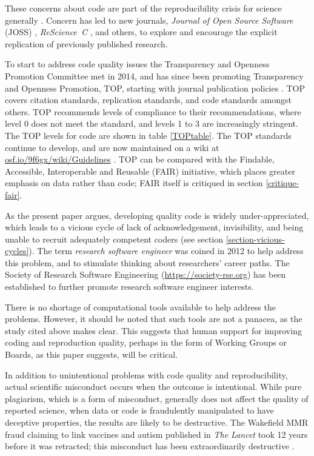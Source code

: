 \documentclass{comjnl}
\begin{document}
These concerns about code are part of the reproducibility crisis for science generally \cite{machine-learning-reproducibility,no-raw-data,data-access,reproducible-manifesto,reproducibility-crisis}. Concern has led to new journals, \emph{Journal of Open Source Software\/} (JOSS) \cite{joss}, \emph{ReScience~C\/} \cite{rescience}, and  others, to explore and encourage the explicit replication of previously published research. 

To start to address code quality issues the Transparency and Openness Promotion Committee met in 2014, and has since been promoting Transparency and Openness Promotion, TOP, starting with journal publication policies \cite{TOP}. TOP covers citation standards, replication standards, and code standards amongst others. TOP recommends levels of compliance to their recommendations, where level 0 does not meet the standard, and levels 1 to 3 are increasingly stringent. The TOP levels for code are shown in table \ref{TOPtable}. The TOP standards continue to develop, and are now maintained on a wiki at \url{osf.io/9f6gx/wiki/Guidelines} \cite{TOP-wiki}. TOP can be compared with the Findable, Accessible, Interoperable and Reusable (FAIR) initiative, which places greater emphasis on data rather than code; FAIR itself is critiqued in section \ref{critique-fair}.

As the present paper argues, developing quality code is widely under-appreciated, which leads to a vicious cycle of lack of acknowledgement, invisibility, and being unable to recruit adequately competent coders (see section \ref{section-vicious-cycles}). The term \emph{research software engineer\/} was coined in 2012 to help address this problem, and to stimulate thinking about researchers' career paths. The Society of Research Software Engineering (\url{https://society-rse.org}) has been established to further promote research software engineer interests.  

There is no shortage of computational tools available to help address the problems. However, it should be noted that such tools are not a panacea, as the study \cite{jupyter-study} cited above makes clear. This suggests that human support for improving coding and reproduction quality, perhaps in the form of Working Groups or Boards, as this paper suggests, will be critical.

In addition to unintentional problems with code quality and reproducibility, actual scientific misconduct occurs when the outcome is intentional. While pure plagiarism, which is a form of misconduct, generally does not affect the quality of reported science, when data or code is fraudulently manipulated to have deceptive properties, the results are likely to be destructive. The Wakefield MMR fraud claiming to link vaccines and autism published in \emph{The Lancet\/} took 12 years before it was retracted; this misconduct has been extraordinarily destructive \cite{MMR-fraud}. 
\end{document}
